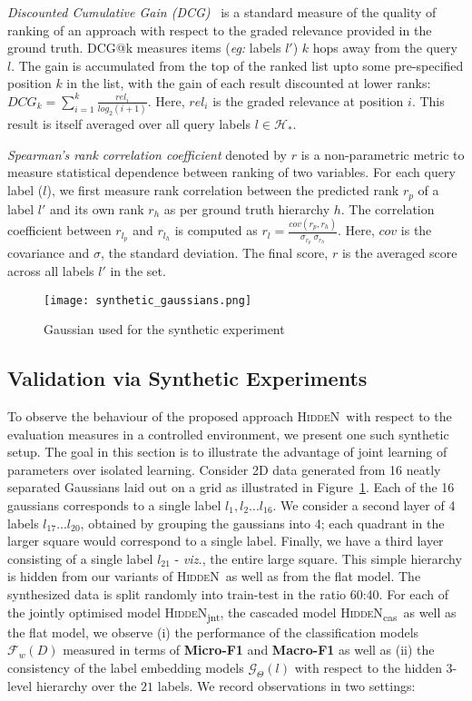 \documentclass[11pt,a4paper]{article}
\newcommand{\model}{\mbox{\textsc{HiddeN}}}
\newcommand{\modeljnt}{\mbox{\textsc{HiddeN}\textsubscript{jnt}}}
\newcommand{\modelcas}{\mbox{\textsc{HiddeN}\textsubscript{cas}}}
\begin{document}
\textit{Discounted Cumulative Gain (DCG)}~\citep{dcg} is a standard measure of the quality of ranking of an approach with respect to the graded relevance provided in the ground truth. DCG@k measures items ({\em eg:} labels $l'$) $k$ hops away from the query $l$. The gain is accumulated from the top of the ranked list upto some pre-specified position $k$ in the list, with the gain of each result discounted at lower ranks: $DCG_k = \sum_{i=1}^k \frac{rel_i}{log_2(i+1)}$. Here, $rel_i$ is the graded relevance at position $i$. This result is itself averaged over all query labels $l \in \mathcal{H}_{*}$. 

\textit{Spearman's rank correlation coefficient} denoted by $r$ is a non-parametric metric to measure statistical dependence between ranking of two variables. For each query label ($l$), we first measure rank correlation between the predicted rank $r_p$ of a label $l'$ and its own rank $r_h$ as per ground truth hierarchy $h$. The correlation coefficient between $r_{l_p}$ and $r_{l_h}$ is computed as $r_l = \frac{cov(r_{p}, r_{h})}{\sigma_{r_{p}}~\sigma_{r_{h}}}$. Here, $cov$ is the covariance and $\sigma$, the standard deviation. The final score, $r$ is the averaged score across all labels $l'$ in the set.

\begin{figure}
    \centering
    \texttt{[image: synthetic\_gaussians.png]}
    \caption{Gaussian used for the synthetic experiment}
    \label{fig:synthetic}
\end{figure}

\subsection{Validation via Synthetic Experiments}
To observe the behaviour of the proposed approach \model\ with respect to the evaluation measures in a controlled environment, we present one such synthetic setup. The goal in this section is to illustrate the advantage of joint learning of parameters over isolated learning. Consider 2D data generated from 16 neatly separated Gaussians laid out on a grid as illustrated in Figure~\ref{fig:synthetic}. Each of the 16 gaussians corresponds to a single label $l_1, l_2... l_{16}$. We consider a second layer of 4 labels $l_{17}...l_{20}$, obtained by grouping the gaussians into 4; each quadrant in the larger square would correspond to a single label.  Finally, we have a third layer consisting of a single label $l_{21}$ - {\em viz.}, the entire large square. This simple hierarchy is hidden from our variants of \model\ as well as from the flat model. The synthesized data is split randomly into train-test in the ratio 60:40. For each of the jointly optimised model \modeljnt, the cascaded model \modelcas\ as well as the flat model, we observe (i) the performance of the classification  models $\mathcal{F}_w(D)$ measured in terms of \textbf{Micro-F1} and \textbf{Macro-F1} as well as (ii) the consistency of the label embedding models $\mathcal{G}_\Theta(l)$ with respect to the hidden 3-level hierarchy over the $21$ labels. We record observations in two settings:
\end{document}
